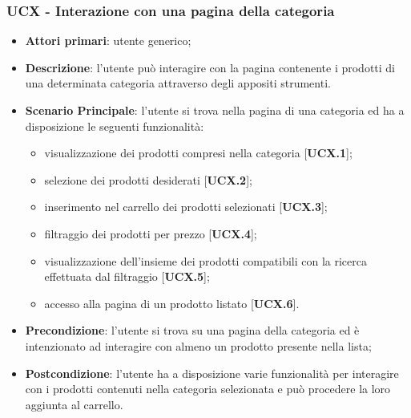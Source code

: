 \subsubsection{UCX - Interazione con una pagina della categoria}
\begin{itemize}
\item \textbf{Attori primari}: utente generico;
\item \textbf{Descrizione}: l'utente può interagire con la pagina contenente i prodotti di una determinata categoria attraverso degli appositi strumenti.
\item \textbf{Scenario Principale}: l'utente si trova nella pagina di una categoria ed ha a disposizione le seguenti funzionalità:
\begin{itemize}
\item visualizzazione dei prodotti compresi nella categoria [\textbf{UCX.1}];
\item selezione dei prodotti desiderati [\textbf{UCX.2}];
\item inserimento nel carrello dei prodotti selezionati [\textbf{UCX.3}];
\item filtraggio dei prodotti per prezzo [\textbf{UCX.4}];
\item visualizzazione dell'insieme dei prodotti compatibili con la ricerca effettuata dal filtraggio [\textbf{UCX.5}];
\item accesso alla pagina di un prodotto listato [\textbf{UCX.6}].
\end{itemize}
\item \textbf{Precondizione}: l'utente si trova su una pagina della categoria ed è intenzionato ad interagire con almeno un prodotto presente nella lista;
\item \textbf{Postcondizione}: l'utente ha a disposizione varie funzionalità per interagire con i prodotti contenuti nella categoria selezionata e può procedere la loro aggiunta al carrello.
\end{itemize}
